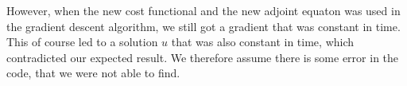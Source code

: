 However, when the new cost functional and the new adjoint equaton was used in the gradient descent algorithm, we still got a gradient that was constant in time. This of course led to a solution $u$ that was also constant in time, which contradicted our expected result. We therefore assume there is some error in the code, that we were not able to find.

